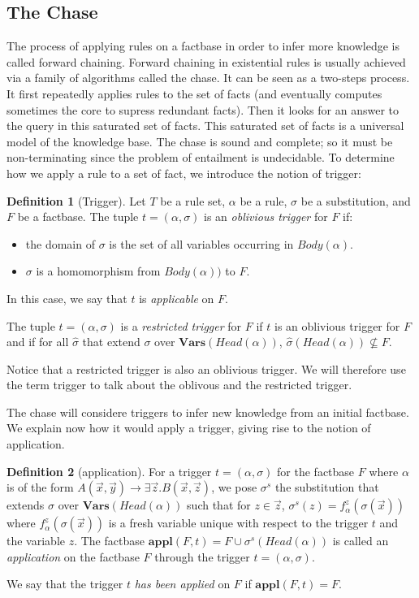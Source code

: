 \documentclass{article}
\theoremstyle{definition}
\newtheorem{definition}{Definition}[section]
\theoremstyle{remark}
\newcommand{\Vars}{\textbf{Vars}}
\newcommand{\Appl}{\textbf{appl}}
\begin{document}
\subsection{The Chase}

The process of applying rules on a factbase in order to infer more knowledge is called forward chaining.   Forward  chaining  in  existential  rules  is  usually achieved  via  a  family  of  algorithms  called the  chase. It can be seen as a two-steps process. It first repeatedly applies rules to the set of facts (and eventually computes sometimes the core to supress redundant facts). Then it looks for an answer to the query in this saturated set of facts. This saturated set of facts is a universal model of the knowledge base. The chase is sound and complete; so it must be non-terminating since the problem of entailment is undecidable. To determine how we apply a rule to a set of fact, we introduce the notion of trigger:

\begin{definition}[Trigger]
Let $T$ be a rule set, $\alpha$ be a rule, $\sigma$ be a substitution, and $F$ be a factbase. The tuple $t = (\alpha,\sigma)$ is an \emph{oblivious trigger} for $F$ if: 
\begin{itemize}
\item the domain of $\sigma$ is the set of all variables occurring in $Body(\alpha)$.
\item $\sigma$ is a homomorphism from $Body(\alpha))$ to $F$.
\end{itemize}
In this case, we say that $t$ is \emph{applicable} on $F$.

The tuple $t = (\alpha,\sigma)$ is a \emph{restricted trigger} for $F$ if $t$ is an oblivious trigger for $F$ and if for all $\hat \sigma$ that extend $\sigma$ over $\Vars(\textit{Head}(\alpha))$, $\hat \sigma(Head(\alpha)) \nsubseteq F$.
\end{definition} 



Notice that a restricted trigger is also an oblivious trigger. We will therefore use the term trigger to talk about the oblivous and the restricted trigger.

The chase will considere triggers to infer new knowledge from an initial factbase. We explain now how it would apply a trigger, giving rise to the notion of application. 

\begin{definition}[application]
For a trigger $t = (\alpha,\sigma)$ for the factbase $F$ where $\alpha$ is of the form $A(\vec x,\vec y) \rightarrow \exists \vec z. B(\vec x,\vec z)$, we pose \emph{$\sigma^s$} the substitution that extends $\sigma$ over $\Vars(\textit{Head}(\alpha))$ such that for $z \in \vec z$, $\sigma^s(z) = f^z_\alpha(\sigma(\vec x))$ where $f^z_\alpha(\sigma(\vec x))$ is a fresh variable unique with respect to the trigger $t$ and the variable $z$.
The factbase $\Appl(F,t)=F \cup \sigma^s(\textit{Head}(\alpha))$ is called an \emph{application} on the factbase $F$ through the trigger $t = (\alpha,\sigma)$. 

We say that the trigger $t$ \emph{has been applied} on $F$ if $\Appl(F,t) = F$.
\end{definition}
\end{document}
